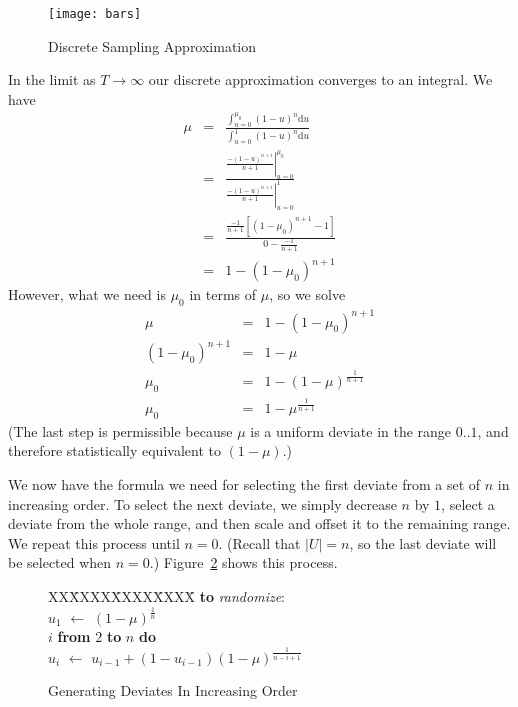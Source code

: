 \documentclass[12pt]{article}
\newcommand{\asgn}{\,\,\leftarrow\,\,}
\newcommand{\du}{{\text{d}u}}
\begin{document}
  \begin{figure}
    \centering
    \texttt{[image: bars]}
    \caption{Discrete Sampling Approximation}\label{fig-calculus}
  \end{figure}

  In the limit as $T\rightarrow\infty$ our discrete
  approximation converges to an integral.  We have
    \begin{eqnarray*}
      \mu &=& \frac{\int_{u=0}^{\mu_0}{(1-u)^n \du}}
                   {\int_{u=0}^{1}{(1-u)^n \du}} \\
	  &=& \frac{\left.\frac{-(1-u)^{n+1}}{n+1}\right|_{u=0}^{\mu_0}}
		   {\left.\frac{-(1-u)^{n+1}}{n+1}\right|_{u=0}^{1}} \\
          &=& \frac{\frac{-1}{n+1}\left[(1-\mu_0)^{n+1}-1\right]}
		   {0-\frac{-1}{n+1}} \\
          &=& 1 - (1 - \mu_0)^{n+1}
    \end{eqnarray*}
  However, what we need is $\mu_0$ in terms of
  $\mu$, so we solve
    \begin{eqnarray*}
       \mu &=& 1 - (1 - \mu_0)^{n+1} \\
       (1 - \mu_0)^{n+1} &=& 1 - \mu \\
       \mu_0 &=& 1 - (1 - \mu)^\frac{1}{n+1} \\
       \mu_0 &=& 1 - \mu^\frac{1}{n+1}
    \end{eqnarray*}
  (The last step is permissible because $\mu$ is a
  uniform deviate in the range $0..1$, and therefore
  statistically equivalent to $(1-\mu)$.)

  We now have the formula we need for selecting the first
  deviate from a set of $n$ in increasing order.  To select
  the next deviate, we simply decrease $n$ by $1$, select a
  deviate from the whole range, and then scale and offset it
  to the remaining range.  We repeat this process until
  $n=0$.  (Recall that $|U|=n$, so the last deviate will be
  selected when $n=0$.)  Figure~\ref{fig-deviate} shows
  this process.
  
  \begin{figure}
    \centering
    \begin{minipage}{0.6\textwidth}
      \begin{tabbing}
      XX\=XXXX\=XXXX\=XXXX\=\kill
      {\bf to} {\it randomize}: \\
      \>$u_1 \asgn (1-\mu)^{\frac{1}{n}}$ \\
       $i$ {\bf from} $2$ {\bf to} $n$ {\bf do} \\
      \>\>$u_i \asgn u_{i-1} + (1-u_{i-1})(1-\mu)^{\frac{1}{n-i+1}}$
    \end{tabbing}
    \end{minipage}
    \caption{Generating Deviates In Increasing Order}\label{fig-deviate}
  \end{figure}
\end{document}
